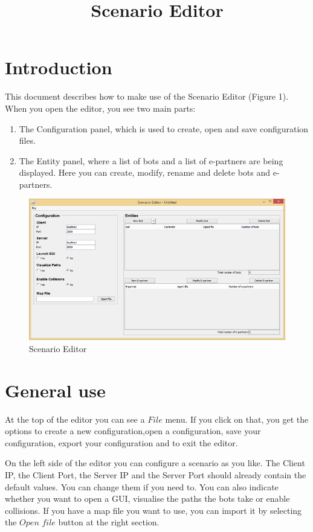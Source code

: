 \documentclass[a4paper]{article}
\title{Scenario Editor}
\date{}
\begin{document}
\maketitle
\newpage

\tableofcontents
\newpage

\section{Introduction}
This document describes how to make use of the Scenario Editor (Figure 1). When you open the editor, you see two main parts:
\begin{enumerate}
\item The Configuration panel, which is used to create, open and save configuration files.
\item The Entity panel, where a list of bots and a list of e-partners are being displayed. Here you can create, modify, rename and delete bots and e-partners.
\end{enumerate}

\begin{figure}[h]
\begin{center}
\includegraphics{editor.png}
\caption{Scenario Editor}
\end{center}
\end{figure}

\section{General use}
At the top of the editor you can see a $File$ menu. If you click on that, you get the options to create a new configuration,open a configuration, save your configuration, export your configuration and to exit the editor.

On the left side of the editor you can configure a scenario as you like. The Client IP, the Client Port, the Server IP and the Server Port should already contain the default values. You can change them if you need to. You can also indicate whether you want to open a GUI, visualise the paths the bots take or enable collisions. If you have a map file you want to use, you can import it by selecting the $Open$ $file$ button at the right section.
\end{document}
